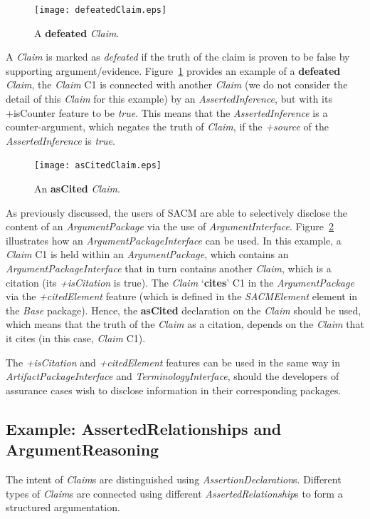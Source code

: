 \begin{figure}
	\centering
	\texttt{[image: defeatedClaim.eps]}
	\caption{A \textbf{defeated} \textit{Claim}.}
	\label{fig:defeatedClaim}
\end{figure}
A \textit{Claim} is marked as \textit{defeated} if the truth of the claim is proven to be false by supporting argument/evidence. 
Figure~\ref{fig:defeatedClaim} provides an example of a \textbf{defeated} \textit{Claim}, the \textit{Claim} C1 is connected with another \textit{Claim} (we do not consider the detail of this \textit{Claim} for this example) by an \textit{AssertedInference}, but with its +isCounter feature to be \textit{true}. 
This means that the \textit{AssertedInference} is a counter-argument, which negates the truth of \textit{Claim}, if the \textit{+source} of the \textit{AssertedInference} is \textit{true}.

\begin{figure}
	\centering
	\texttt{[image: asCitedClaim.eps]}
	\caption{An \textbf{asCited} \textit{Claim}.}
	\label{fig:asCited}
\end{figure}

As previously discussed, the users of SACM are able to selectively disclose the content of an \textit{ArgumentPackage} via the use of \textit{ArgumentInterface}. 
Figure~\ref{fig:asCited} illustrates how an \textit{ArgumentPackageInterface} can be used. 
In this example, a \textit{Claim} C1 is held within an \textit{ArgumentPackage}, which contains an \textit{ArgumentPackageInterface} that in turn contains another \textit{Claim}, which is a citation (its \textit{+isCitation} is true). 
The \textit{Claim} `\textbf{cites}' C1 in the \textit{ArgumentPackage} via the \textit{+citedElement} feature (which is defined in the \textit{SACMElement} element in the \textit{Base} package). 
Hence, the \textbf{asCited} declaration on the \textit{Claim} should be used, which means that the truth of the \textit{Claim} as a citation, depends on the \textit{Claim} that it cites (in this case, \textit{Claim} C1).

The \textit{+isCitation} and \textit{+citedElement} features can be used in the same way in \textit{ArtifactPackageInterface} and \textit{TerminologyInterface}, should the developers of assurance cases wish to disclose information in their corresponding packages.

\label{sec:confidence}
\subsection{Example: AssertedRelationships and ArgumentReasoning}
\label{sec:relationships}
The intent of \textit{Claim}s are distinguished using \textit{AssertionDeclaration}s. 
Different types of \textit{Claim}s are connected using different \textit{AssertedRelationship}s to form a structured argumentation. 

